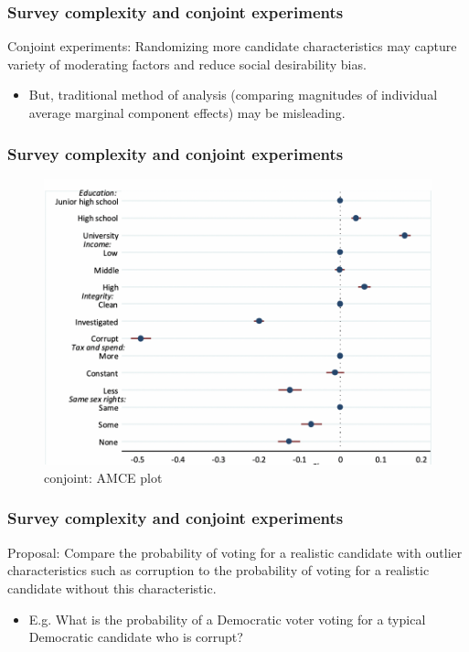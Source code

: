 \documentclass[usenames,dvipsnames]{beamer}
\begin{document}
\begin{frame}
\frametitle{Survey complexity and conjoint experiments}
\textcolor{Cerulean}{Conjoint experiments}: Randomizing more candidate characteristics may capture variety of moderating factors and reduce social desirability bias.
\begin{itemize}
\pause
\item But, traditional method of analysis (comparing magnitudes of individual average marginal component effects) may be misleading. 
\end{itemize}

\end{frame}

\begin{frame}
\frametitle{Survey complexity and conjoint experiments}

\begin{figure}[!hb]
\hspace*{-11mm}
\includegraphics[scale = 0.6]{fz_conjoint.png}
\vspace{0.2cm}
\caption{\citet{franchino2015voting} conjoint: AMCE plot}
\small
\vspace{-0.3cm}
\label{fig: fz_amce}
\end{figure}

\end{frame}

\begin{frame}
\frametitle{Survey complexity and conjoint experiments}
\textcolor{Cerulean}{Proposal}: Compare the probability of voting for a \textcolor{Cerulean}{realistic candidate} with outlier characteristics such as corruption to the probability of voting for a \textcolor{Cerulean}{realistic candidate} without this characteristic.
\begin{itemize}
\item E.g. What is the probability of a Democratic voter voting for a typical Democratic candidate who is corrupt?
\end{itemize}

\end{frame}
\end{document}
